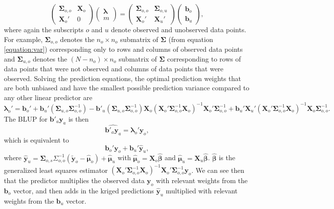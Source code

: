 \documentclass[]{interact}
\theoremstyle{plain}%
\theoremstyle{definition}
\theoremstyle{remark}
\begin{document}
\begin{equation}
\begin{pmatrix}
\bm{\Sigma}_{o, o} & \mathbf{X}_o \\
\mathbf{X}_o' & 0
\end{pmatrix} 
\begin{pmatrix}
\bm{\lambda} \\
m
\end{pmatrix} = 
\begin{pmatrix}
\bm{\Sigma}_{o, o} & \bm{\Sigma}_{o, u} \\
\mathbf{X}_{o}' & \mathbf{X}_{u}'
\end{pmatrix} 
\begin{pmatrix}
\mathbf{b}_{o} \\
\mathbf{b}_{u}
\end{pmatrix},
\end{equation} \noindent where again the subscripts \(o\) and \(u\)
denote observed and unobserved data points. For example,
\(\bm{\Sigma}_{o, o}\) denotes the \(n_o \times n_o\) submatrix of
\(\bm{\Sigma}\) (from equation \ref{equation:var}) corresponding only to
rows and columns of observed data points and \(\bm{\Sigma}_{u, o}\)
denotes the \((N - n_o) \times n_o\) submatrix of \(\bm{\Sigma}\)
corresponding to rows of data points that were not observed and columns
of data points that were observed. Solving the prediction equations, the
optimal prediction weights that are both unbiased and have the smallest
possible prediction variance compared to any other linear predictor are
\mbox{} \begin{equation}
\bm{\lambda}_o' = \mathbf{b}_{o}' + \mathbf{b}_{u}' (\bm{\Sigma}_{u, o}\bm{\Sigma}_{o, o}^{-1}) - \mathbf{b}'_{u}(\bm{\Sigma}_{u, o} \bm{\Sigma}_{o, o}^{-1})\mathbf{X}_o(\mathbf{X}_o'\bm{\Sigma}_{o, o}^{-1}\mathbf{X}_o)^{-1}\mathbf{X}_o'\bm{\Sigma}_{o, o}^{-1} + \mathbf{b}_{u}' \mathbf{X}_{u}'(\mathbf{X}_o'\bm{\Sigma}_{o, o}^{-1}\mathbf{X}_o)^{-1}\mathbf{X}_o \bm{\Sigma}_{o, o}^{-1}.
\end{equation} \noindent The BLUP for \(\mathbf{b}'_a \mathbf{y}_a\) is
then \mbox{} \begin{equation} \label{equation:blup}
\widehat{\mathbf{b}'_a \mathbf{y}_a} = \bm{\lambda}_o' \mathbf{y}_o,
\end{equation} \noindent which is equivalent to \mbox{}
\begin{equation*}
\mathbf{b}_{o}'\mathbf{y}_{o} + \mathbf{b}_{u}' \mathbf{\hat{y}}_{u},
\end{equation*} \noindent where
\(\mathbf{\hat{y}}_{u} = \bm{\Sigma}_{o, s} \Sigma_{o, o}^{-1} (\mathbf{\tilde{y}}_o - \bm{\hat{\mu}}_o) + \bm{\hat{\mu}}_u\)
with \(\bm{\hat{\mu}}_o = \mathbf{X}_o \bm{\hat{\beta}}\) and
\(\bm{\hat{\mu}}_u = \mathbf{X}_u \bm{\hat{\beta}}\).
\(\bm{\hat{\beta}}\) is the generalized least squares estimator
\((\mathbf{X}_o' \bm{\Sigma}_{o, o}^{-1} \mathbf{X}_o)^{-1} \mathbf{X}_o' \bm{\Sigma}_{o, o}^{-1} \mathbf{y}_o\).
We can see then that the predictor multiplies the observed data
\(\mathbf{y}_o\) with relevant weights from the \(\mathbf{b}_o\) vector,
and then adds in the kriged predictions \(\mathbf{\hat{y}}_{u}\)
multiplied with relevant weights from the \(\mathbf{b}_u\) vector.
\end{document}
